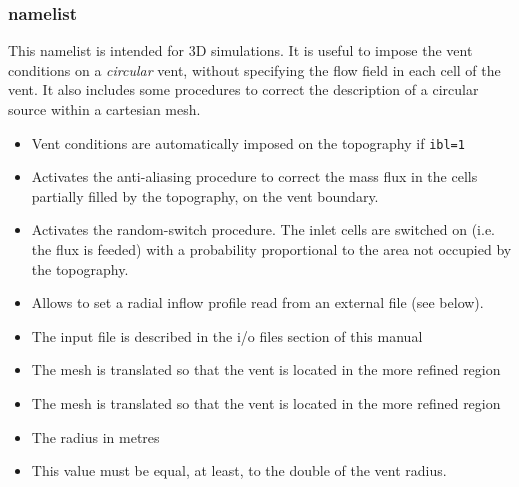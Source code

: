 \subsubsection{ namelist}
This namelist is intended for 3D simulations. It is useful to impose the vent
conditions on a {\em circular} vent, without specifying the flow field in each 
cell of the vent. It also includes some procedures to correct the description
of a circular source within a cartesian mesh.

\begin{itemize}
\item
{}
{Vent conditions are automatically imposed on the topography if {\tt ibl=1}}

\item
{}
{Activates the anti-aliasing procedure to correct the mass flux in the cells
partially filled by the topography, on the vent boundary.}

\item
{}
{Activates the random-switch procedure. The inlet cells are switched on
(i.e. the flux is feeded) with a probability proportional to the area not 
occupied by the topography.}

\item
{}
{Allows to set a radial inflow profile read from an external file (see below).}

\item
{}
{The input file is described in the i/o files section of this manual}

\item
{}
{The mesh is translated so that the vent is located in the more refined region}

\item
{}
{The mesh is translated so that the vent is located in the more refined region}

\item
{}
{The radius in metres}

\item
{}
{This value must be equal, at least, to the double of the vent radius.}


\end{itemize}
